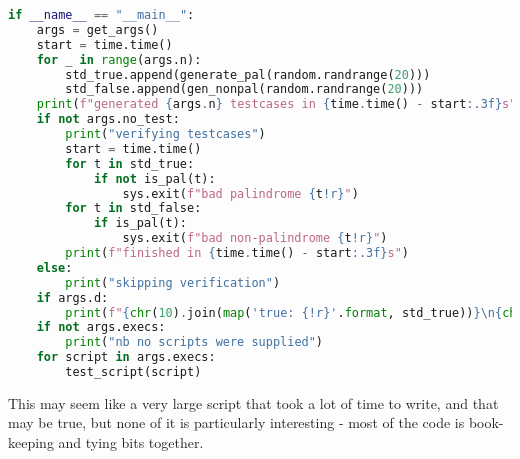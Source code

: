 \documentclass{article}
\begin{document}
\begin{lstlisting}[language=Python, caption=Testing script]
if __name__ == "__main__":
    args = get_args()
    start = time.time()
    for _ in range(args.n):
        std_true.append(generate_pal(random.randrange(20)))
        std_false.append(gen_nonpal(random.randrange(20)))
    print(f"generated {args.n} testcases in {time.time() - start:.3f}s")
    if not args.no_test:
        print("verifying testcases")
        start = time.time()
        for t in std_true:
            if not is_pal(t):
                sys.exit(f"bad palindrome {t!r}")
        for t in std_false:
            if is_pal(t):
                sys.exit(f"bad non-palindrome {t!r}")
        print(f"finished in {time.time() - start:.3f}s")
    else:
        print("skipping verification")
    if args.d:
        print(f"{chr(10).join(map('true: {!r}'.format, std_true))}\n{chr(10).join(map('false: {!r}'.format, std_false))}")
    if not args.execs:
        print("nb no scripts were supplied")
    for script in args.execs:
        test_script(script)
\end{lstlisting}

    This may seem like a very large script that took a lot of time to write,
    and that may be true, but none of it is particularly interesting - most of
    the code is book-keeping and tying bits together.
\end{document}
